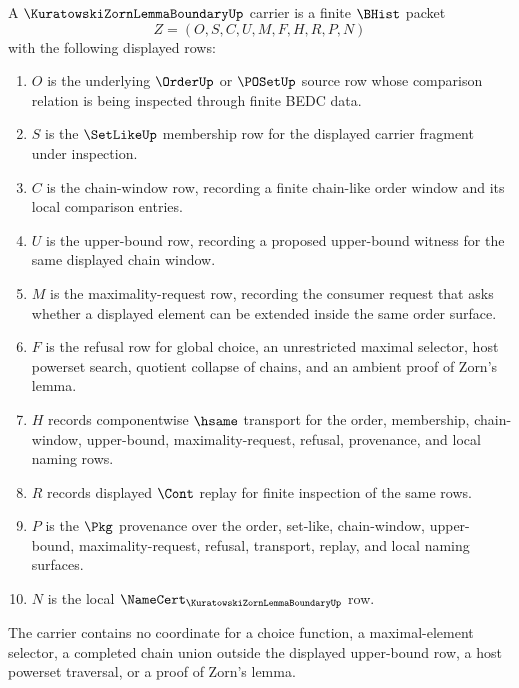 \begin{definition}
\label{def:kuratowski-zorn-lemma-boundary-carrier}
A $\KuratowskiZornLemmaBoundaryUp$ carrier is a finite $\BHist$ packet
$$
Z=(O,S,C,U,M,F,H,R,P,N)
$$
with the following displayed rows:
\begin{enumerate}
\item $O$ is the underlying $\OrderUp$ or $\POSetUp$ source row whose comparison relation is being inspected through finite BEDC data.
\item $S$ is the $\SetLikeUp$ membership row for the displayed carrier fragment under inspection.
\item $C$ is the chain-window row, recording a finite chain-like order window and its local comparison entries.
\item $U$ is the upper-bound row, recording a proposed upper-bound witness for the same displayed chain window.
\item $M$ is the maximality-request row, recording the consumer request that asks whether a displayed element can be extended inside the same order surface.
\item $F$ is the refusal row for global choice, an unrestricted maximal selector, host powerset search, quotient collapse of chains, and an ambient proof of Zorn's lemma.
\item $H$ records componentwise $\hsame$ transport for the order, membership, chain-window, upper-bound, maximality-request, refusal, provenance, and local naming rows.
\item $R$ records displayed $\Cont$ replay for finite inspection of the same rows.
\item $P$ is the $\Pkg$ provenance over the order, set-like, chain-window, upper-bound, maximality-request, refusal, transport, replay, and local naming surfaces.
\item $N$ is the local $\NameCert_{\KuratowskiZornLemmaBoundaryUp}$ row.
\end{enumerate}
The carrier contains no coordinate for a choice function, a maximal-element selector, a completed chain union outside the displayed upper-bound row, a host powerset traversal, or a proof of Zorn's lemma.
\end{definition}

